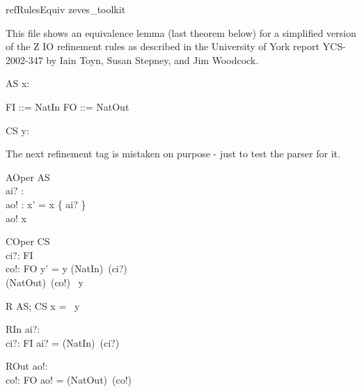 \begin{zsection}
   \SECTION refRulesEquiv \parents zeves\_toolkit
\end{zsection}

This file shows an equivalence lemma (last theorem below) for a simplified
version of the Z IO refinement rules as described in the University of York
report YCS-2002-347 by Iain Toyn, Susan Stepney, and Jim Woodcock.

\begin{schema}{AS}
   x: \power~\nat
\end{schema}
\begin{zed}
   FI ::= NatIn \ldata \nat \rdata
 \also
   FO ::= NatOut \ldata \nat \rdata
\end{zed}

\begin{schema}{CS}
   y: \seq~\nat
\end{schema}

The next refinement tag is mistaken on purpose - just to test the parser for it.
\begin{schema}{AOper}
   \Delta AS\\
   ai? : \nat\\
   ao! : \nat
\where
   x' = x \cup \{ ai? \}
   \\
   ao! \in x
\end{schema}

\begin{schema}{COper}
   \Delta CS \\
   ci?: FI \\
   co!: FO
\where
   y' = y \cat \langle (NatIn\inv)~(ci?) \rangle \\
   (NatOut\inv)~(co!) \in \ran~y
\end{schema}

\begin{schema}{R}
   AS; CS
\where
   x = \ran~y
\end{schema}

\begin{schema}{RIn}
   ai?: \nat \\
   ci?: FI
\where
   ai? = (NatIn\inv)~(ci?)
\end{schema}

\begin{schema}{ROut}
   ao!: \nat \\
   co!: FO
\where
   ao! = (NatOut\inv)~(co!)
\end{schema}

